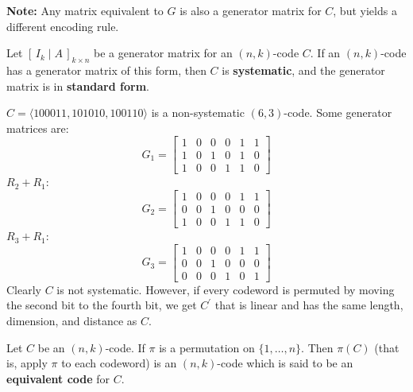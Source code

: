 \textbf{Note:} Any matrix equivalent to $ G $ is also a generator matrix
for $ C $, but yields a different encoding rule.

\begin{defbox}
    \begin{definition}
        Let $ \left[\, I_k\mid A \,\right]_{k\times n} $ be a generator matrix
        for an $ (n,k) $-code $ C $. If an $ (n,k) $-code has a generator
        matrix of this form, then $ C $ is \textbf{systematic}, and the generator
        matrix is in \textbf{standard form}.
    \end{definition} \end{defbox}

\begin{exbox}
    \begin{example}
        $ C=\langle 100011,101010,100110\rangle $
        is a non-systematic $ (6,3) $-code.
        Some generator matrices are:
        \[ G_1=\left[
                \begin{array}{ccc|ccc}
                    1 & 0 & 0 & 0 & 1 & 1 \\
                    1 & 0 & 1 & 0 & 1 & 0 \\
                    1 & 0 & 0 & 1 & 1 & 0
                \end{array} \right] \]
        $ R_2+R_1 $:
        \[ G_2= \left[
                \begin{array}{ccc|ccc}
                    1 & 0 & 0 & 0 & 1 & 1 \\
                    0 & 0 & 1 & 0 & 0 & 0 \\
                    1 & 0 & 0 & 1 & 1 & 0
                \end{array} \right] \]
        $ R_3+R_1 $:
        \[ G_3=\left[
                \begin{array}{ccc|ccc}
                    1 & 0 & 0 & 0 & 1 & 1 \\
                    0 & 0 & 1 & 0 & 0 & 0 \\
                    0 & 0 & 0 & 1 & 0 & 1
                \end{array} \right] \]
        Clearly $ C $ is not systematic. However, if every codeword
        is permuted by moving the second bit to the fourth bit, we get $ C^{\prime} $
        that is linear and has the same length, dimension, and distance as $ C $.
    \end{example}
\end{exbox}

\begin{defbox}
    \begin{definition}
        Let $ C $ be an $ (n,k) $-code. If $ \pi $ is a permutation on
        $ \{1,\ldots ,n\} $. Then $ \pi(C) $ (that is, apply $ \pi $ to each
        codeword) is an $ (n,k) $-code which is said to be an \textbf{equivalent code}
        for $ C $.
    \end{definition} \end{defbox}

